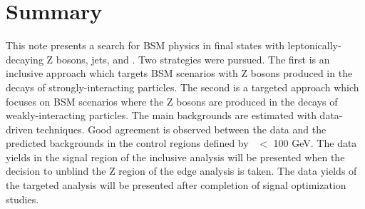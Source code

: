 \section{Summary}

This note presents a search for BSM physics in final states with leptonically-decaying Z bosons, jets, and \MET. 
Two strategies were pursued. The first is an inclusive approach which targets BSM scenarios with Z bosons produced
in the decays of strongly-interacting particles. The second is a targeted approach which focuses on BSM scenarios
where the Z bosons are produced in the decays of weakly-interacting particles. The main backgrounds are
estimated with data-driven techniques. Good agreement is observed between the data and the predicted backgrounds
in the control regions defined by \MET\ $<$ 100 GeV. The data yields in the signal region of the inclusive analysis
will be presented when the decision to unblind the Z region of the edge analysis is taken. The data yields of the
targeted analysis will be presented after completion of signal optimization studies.
